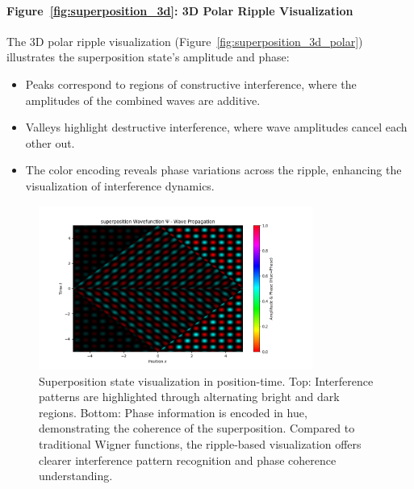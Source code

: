 \documentclass[12pt]{article}
\begin{document}
\paragraph{Figure~\ref{fig:superposition_3d}: 3D Polar Ripple Visualization}
The 3D polar ripple visualization (Figure~\ref{fig:superposition_3d_polar}) illustrates the superposition state’s amplitude and phase:
\begin{itemize}
    \item Peaks correspond to regions of constructive interference, where the amplitudes of the combined waves are additive.
    \item Valleys highlight destructive interference, where wave amplitudes cancel each other out.
    \item The color encoding reveals phase variations across the ripple, enhancing the visualization of interference dynamics.
\end{itemize}

\begin{figure}[H]
\centering
\includegraphics[width=0.8\textwidth]{images/superposition_wavefunction_probability_density_with_phase.png}
\caption{Superposition state visualization in position-time. Top: Interference patterns are highlighted through alternating bright and dark regions. Bottom: Phase information is encoded in hue, demonstrating the coherence of the superposition. Compared to traditional Wigner functions, the ripple-based visualization offers clearer interference pattern recognition and phase coherence understanding.}
\label{fig:superposition}
\end{figure}
\end{document}
